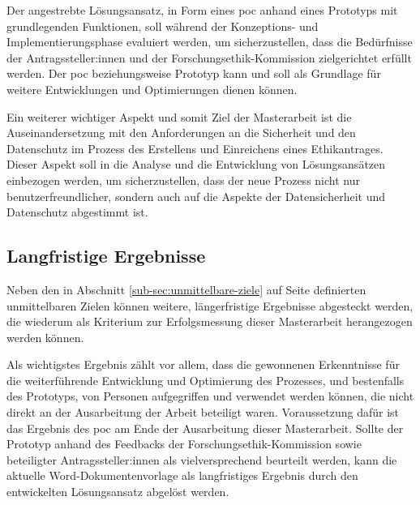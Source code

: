 Der angestrebte Lösungsansatz, in Form eines \ac{poc} anhand eines Prototyps mit grundlegenden Funktionen, soll während der Konzeptions- und Implementierungsphase evaluiert werden, um sicherzustellen, dass die Bedürfnisse der Antragssteller:innen und der Forschungsethik-Kommission zielgerichtet erfüllt werden. Der \ac{poc} beziehungsweise Prototyp kann und soll als Grundlage für weitere Entwicklungen und Optimierungen dienen können.

Ein weiterer wichtiger Aspekt und somit Ziel der Masterarbeit ist die Auseinandersetzung mit den Anforderungen an die Sicherheit und den Datenschutz im Prozess des Erstellens und Einreichens eines Ethikantrages. Dieser Aspekt soll in die Analyse und die Entwicklung von Lösungsansätzen einbezogen werden, um sicherzustellen, dass der neue Prozess nicht nur benutzerfreundlicher, sondern auch auf die Aspekte der Datensicherheit und Datenschutz abgestimmt ist.

\subsection{Langfristige Ergebnisse}
\label{sub-sec:langfristige-ergebnisse}

Neben den in Abschnitt \ref{sub-sec:unmittelbare-ziele} auf Seite \pageref{sub-sec:unmittelbare-ziele} definierten unmittelbaren Zielen können weitere, längerfristige Ergebnisse abgesteckt werden, die wiederum als Kriterium zur Erfolgsmessung dieser Masterarbeit herangezogen werden können.

Als wichtigstes Ergebnis zählt vor allem, dass die gewonnenen Erkenntnisse für die weiterführende Entwicklung und Optimierung des Prozesses, und bestenfalls des Prototyps, von Personen aufgegriffen und verwendet werden können, die nicht direkt an der Ausarbeitung der Arbeit beteiligt waren. Voraussetzung dafür ist das Ergebnis des \ac{poc} am Ende der Ausarbeitung dieser Masterarbeit. Sollte der Prototyp anhand des Feedbacks der Forschungsethik-Kommission sowie beteiligter Antragssteller:innen als vielversprechend beurteilt werden, kann die aktuelle Word-Dokumentenvorlage als langfristiges Ergebnis durch den entwickelten Lösungsansatz abgelöst werden.

\medskip

